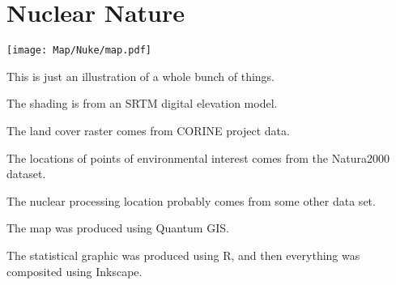 

\chapter{Nuclear Nature}

\begin{marginfigure}
\texttt{[image: Map/Nuke/map.pdf]}
\end{marginfigure}

This is just an illustration of a whole bunch of things.

The shading is from an SRTM digital elevation model.

The land cover raster comes from CORINE project data.

The locations of points of environmental interest comes from the Natura2000 dataset.

The nuclear processing location probably comes from some other data set.

The map was produced using Quantum GIS.

The statistical graphic was produced using R, and then everything was 
composited using Inkscape.

